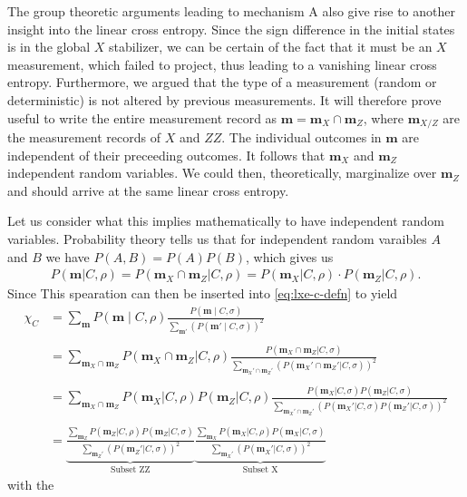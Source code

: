 The group theoretic arguments leading to mechanism \textsf{A} also give rise to
another insight into the linear cross entropy. Since the sign difference in the
initial states is in the global $X$ stabilizer, we can be certain of the fact
that it must be an $X$ measurement, which failed to project, thus leading to a
vanishing linear cross entropy. Furthermore, we argued that the type of a
measurement (random or deterministic) is not altered by previous measurements.
It will therefore prove useful to write the entire measurement record as
$\mathbf{m} = \mathbf{m}_X \cap \mathbf{m}_Z$, where $\mathbf{m}_{X/Z}$ are the
measurement records of $X$ and $ZZ$. The individual outcomes in $\mathbf{m}$
are independent of their preceeding outcomes. It follows that $\mathbf{m}_X$
and $\mathbf{m}_Z$ independent random variables. We could then, theoretically,
marginalize over $\mathbf{m}_Z$ and should arrive at the same linear cross
entropy.

Let us consider what this implies mathematically to have independent random
variables.
Probability theory tells us that for independent random varaibles $A$ and $B$
we have $P(A, B) = P(A)P(B)$, which gives us
\begin{align}
      P(\mathbf{m} | C, \rho) = P(\mathbf{m}_X \cap \mathbf{m}_Z | C, \rho) =
    P(\mathbf{m}_X | C, \rho)\cdot P(\mathbf{m}_Z | C, \rho)
.\end{align}
Since 
This spearation can then be inserted into \cref{eq:lxe-c-defn} to yield
\begin{align}
      \label{eq:lxe-subset}
      \chi_C &= \sum_{\mathbf{m}} P(\mathbf{m} \mid C, \rho) \frac{P(\mathbf{m} \mid
      C, \sigma)}{\sum_{\mathbf{m}'}\left(P(\mathbf{m}' \mid
      C, \sigma)\right)^2} \nonumber\\
      \nonumber\\
      &= \sum_{\mathbf{m}_X \cap \mathbf{m}_Z} P(\mathbf{m}_X \cap \mathbf{m}_Z |
        C, \rho) \frac{P(\mathbf{m}_X \cap \mathbf{m}_Z| C,
        \sigma)}{\sum_{\mathbf{m}_X' \cap \mathbf{m}_Z'} \left(P(\mathbf{m}_X' \cap
        \mathbf{m}_Z'|C,\sigma)\right)^2}\nonumber\\
        \nonumber\\
      &= \sum_{\mathbf{m}_X \cap \mathbf{m}_Z} P(\mathbf{m}_X | C, \rho) P(
        \mathbf{m}_Z | C, \rho) \frac{P(\mathbf{m}_X | C, \sigma) P( \mathbf{m}_Z|
        C, \sigma)}{\sum_{\mathbf{m}_X' \cap \mathbf{m}_Z'}
          \left(P(\mathbf{m}_X' | C,
        \sigma) P( \mathbf{m}_Z'|C,\sigma)\right)^2}\nonumber\\
        \nonumber\\
      &= \underbrace{\frac{\sum_{\mathbf{m}_Z} P(\mathbf{m}_Z | C, \rho)
          P(\mathbf{m}_Z | C, \sigma)}{\sum_{\mathbf{m}_Z'}
          \left(P(\mathbf{m}_Z' |
          C, \sigma)\right)^2}}_{\text{Subset ZZ}}
          \underbrace{\frac{\sum_{\mathbf{m}_X} P(\mathbf{m}_X | C, \rho)
          P(\mathbf{m}_X | C, \sigma)}{\sum_{\mathbf{m}_X'}
          \left(P(\mathbf{m}_X' |
          C, \sigma)\right)^2}}_{\text{Subset X}}
\end{align}
with the 

